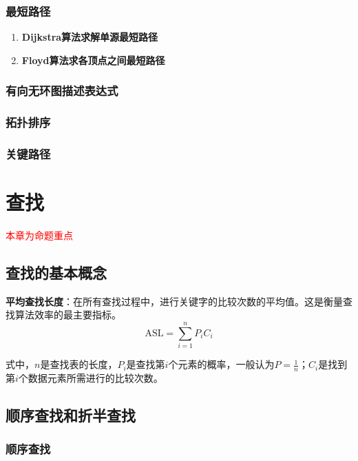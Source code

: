 \documentclass[12pt, a4paper, oneside]{ctexart}
\begin{document}
\subsubsection{最短路径}

\begin{enumerate}
  \item {\bf Dijkstra算法求解单源最短路径}
  \item {\bf Floyd算法求各顶点之间最短路径}
\end{enumerate}

\subsubsection{有向无环图描述表达式}

\subsubsection{拓扑排序}

\subsubsection{关键路径}

\section{查找}

\textcolor{red}{本章为命题重点}

\subsection{查找的基本概念}

\textbf{平均查找长度}：在所有查找过程中，进行关键字的比较次数的平均值。这是衡量查找算法效率的最主要指标。
\begin{equation*}
  \text{ASL}=\sum_{i=1}^{n}P_i C_i
\end{equation*}

式中，$n$是查找表的长度，$P_i$是查找第$i$个元素的概率，一般认为$P=\frac{1}{n}$；$C_i$是找到第$i$个数据元素所需进行的比较次数。

\subsection{顺序查找和折半查找}

\subsubsection{顺序查找}
\end{document}

